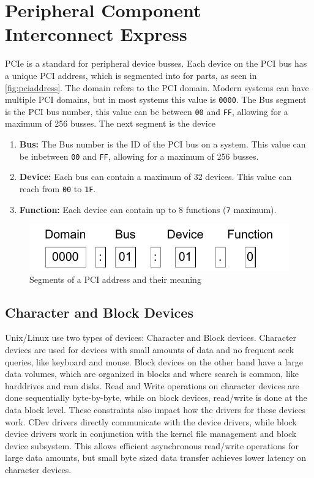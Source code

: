 \section{Peripheral Component Interconnect Express}
PCIe is a standard for peripheral device busses. Each device on the PCI bus has a unique PCI address, which is segmented into for parts, as seen in \autoref{fig:pciaddress}. The domain refers to the PCI domain. Modern systems can have multiple PCI domains, but in most systems this value is \texttt{0000}. The Bus segment is the PCI bus number, this value can be between \texttt{00} and \texttt{FF}, allowing for a maximum of 256 busses. The next segment is the device


\begin{enumerate}
    \item \textbf{Bus: } The Bus number is the ID of the PCI bus on a system. This value can be inbetween \texttt{00} and \texttt{FF}, allowing for a maximum of 256 busses.
    \item \textbf{Device: } Each bus can contain a maximum of 32 devices. This value can reach from \texttt{00} to \texttt{1F}.
    \item \textbf{Function: } Each device can contain up to 8 functions (\texttt{7} maximum).
\end{enumerate}

\begin{figure}
    \centering
    \includegraphics[width=\textwidth]{figures/PCIAddress.pdf}
    \caption{Segments of a PCI address and their meaning}
    \label{fig:pciaddress}
\end{figure}

\subsection{Character and Block Devices}
Unix/Linux use two types of devices: Character and Block devices. Character devices are used for devices with small amounts of data and no frequent seek queries, like keyboard and mouse. Block devices on the other hand have a large data volumes, which are organized in blocks and where search is common, like harddrives and ram disks.
Read and Write operations on character devices are done sequentially byte-by-byte, while on block devices, read/write is done at the data block level.
These constraints also impact how the drivers for these devices work. CDev drivers directly communicate with the device drivers, while block device drivers work in conjunction with the kernel file management and block device subsystem. This allows efficient asynchronous read/write operations for large data amounts, but small byte sized data transfer achieves lower latency on character devices.

